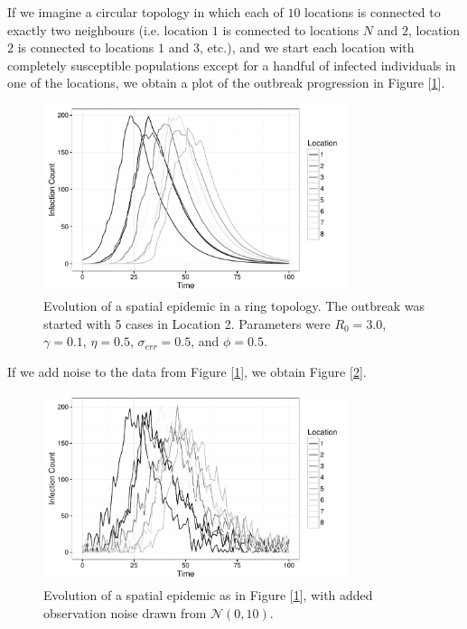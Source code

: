 	If we imagine a circular topology in which each of $10$ locations is connected to exactly two neighbours (i.e. location $1$ is connected to locations $N$ and $2$, location $2$ is connected to locations $1$ and $3$, etc.), and we start each location with completely susceptible populations except for a handful of infected individuals in one of the locations, we obtain a plot of the outbreak progression in Figure [\ref{dataplot}].

	\begin{figure}
        \centering
        \captionsetup{width=.8\linewidth}
        \includegraphics[width=0.8\textwidth]{./images/dataplot.pdf}
        \caption{Evolution of a spatial epidemic in a ring topology. The outbreak was started with 5 cases in Location 2. Parameters were $R_0 = 3.0$, $\gamma = 0.1$, $\eta = 0.5$, $\sigma_{err} = 0.5$, and $\phi = 0.5$. \label{dataplot}}
    \end{figure}

    If we add noise to the data from Figure [\ref{dataplot}], we obtain Figure [\ref{dataplot2}].

    \begin{figure}
        \centering
        \captionsetup{width=.8\linewidth}
        \includegraphics[width=0.8\textwidth]{./images/dataplot2.pdf}
        \caption{Evolution of a spatial epidemic as in Figure [\ref{dataplot}], with added observation noise drawn from $\mathcal{N}(0,10)$. \label{dataplot2}}
    \end{figure}


